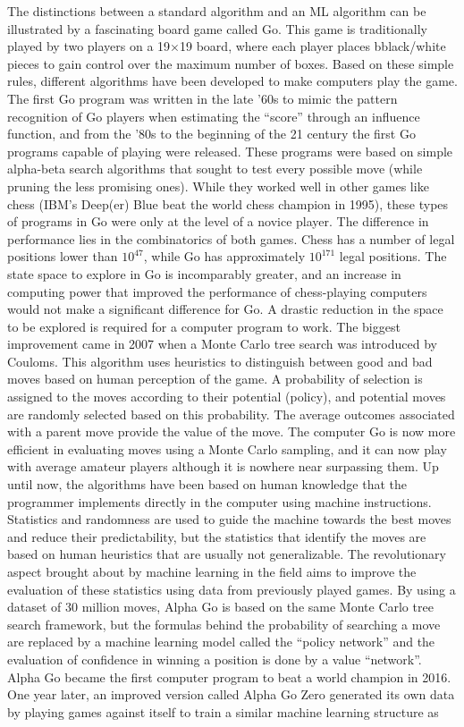 \documentclass[main]{subfiles}
\begin{document}
The distinctions between a standard algorithm and an ML algorithm can be illustrated by a fascinating board game called Go. This game is traditionally played by two players on a 19$\times$19 board, where each player places bblack/white pieces to gain control over the maximum number of boxes. Based on these simple rules, different algorithms have been developed to make computers play the game. The first Go program was written in the late ’60s to mimic the pattern recognition of Go players when estimating the ``score'' through an influence function,\autocite{zobrist1970feature} and from the ’80s to the beginning of the 21 century the first Go programs capable of playing were released. These programs were based on simple alpha-beta search algorithms that sought to test every possible move (while pruning the less promising ones). While they worked well in other games like chess (IBM's Deep(er) Blue beat the world chess champion in 1995), these types of programs in Go were only at the level of a novice player. The difference in performance lies in the combinatorics of both games. Chess has a number of legal positions lower than $10^{47}$,\autocite{website_labelle} while Go has approximately $10^{171}$ legal positions.\autocite{Tromp_2007,github_tromp_go} The state space to explore in Go is incomparably greater, and an increase in computing power that improved the performance of chess-playing computers would not make a significant difference for Go. A drastic reduction in the space to be explored is required for a computer program to work. The biggest improvement came in 2007 when a Monte Carlo tree search was introduced by Couloms.\autocite{Coulom_2007} This algorithm uses heuristics to distinguish between good and bad moves based on human perception of the game. A probability of selection is assigned to the moves according to their potential (policy), and potential moves are randomly selected based on this probability. The average outcomes associated with a parent move provide the value of the move. The computer Go is now more efficient in evaluating moves using a Monte Carlo sampling, and it can now play with average amateur players although it is nowhere near surpassing them. Up until now, the algorithms have been based on human knowledge that the programmer implements directly in the computer using machine instructions. Statistics and randomness are used to guide the machine towards the best moves and reduce their predictability, but the statistics that identify the moves are based on human heuristics that are usually not generalizable. The revolutionary aspect brought about by machine learning in the field aims to improve the evaluation of these statistics using data from previously played games. By using a dataset of 30 million moves, Alpha Go is based on the same Monte Carlo tree search framework, but the formulas behind the probability of searching a move are replaced by a machine learning model called the ``policy network'' and the evaluation of confidence in winning a position is done by a value ``network''.\autocite{Silver_2016} Alpha Go became the first computer program to beat a world champion in 2016. One year later, an improved version called Alpha Go Zero generated its own data by playing games against itself to train a similar machine learning structure as 
\end{document}
